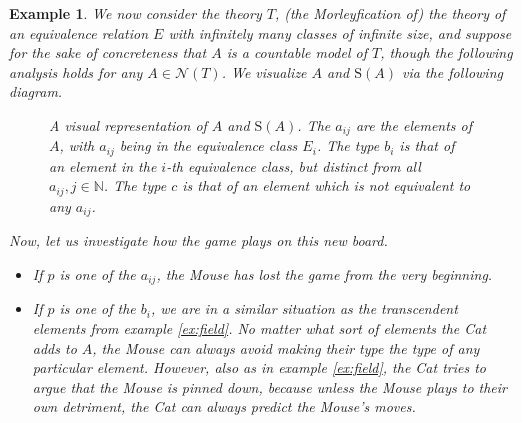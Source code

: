 \documentclass{article}
\newtheorem{example}[theorem]{Example}
\theoremstyle{nonumberplain}
\newcommand{\N}{\mathbb{N}}
\newcommand{\calN}{\mathcal{N}}
\newcommand{\Stone}{\mathrm{S}}
\begin{document}
\begin{example}\label{ex:equiv}
We now consider the theory $T$, (the Morleyfication of) the theory of an equivalence relation $E$ with infinitely many classes of infinite size, and suppose for the sake of concreteness that $A$ is a countable model of $T$, though the following analysis holds for any $A \in \calN(T)$. We visualize $A$ and $\Stone(A)$ via the following diagram.
\begin{figure}[H]
\centering
{}
\caption{A visual representation of $A$ and $\Stone(A)$. The $a_{ij}$ are the elements of $A$, with $a_{ij}$ being in the equivalence class $E_i$. The type $b_i$ is that of an element in the $i$-th equivalence class, but distinct from all $a_{ij}, j \in \N$. The type $c$ is that of an element which is not equivalent to any $a_{ij}$.}
\end{figure}

Now, let us investigate how the game plays on this new board.
\begin{itemize}
\item If $p$ is one of the $a_{ij}$, the Mouse has lost the game from the very beginning.

\item If $p$ is one of the $b_i$, we are in a similar situation as the transcendent elements from example \ref{ex:field}. No matter what sort of elements the Cat adds to $A$, the Mouse can always avoid making their type the type of any particular element. However, also as in example \ref{ex:field}, the Cat tries to argue that the Mouse is pinned down, because unless the Mouse plays to their own detriment, the Cat can always predict the Mouse's moves.


\end{itemize}
\end{example}
\end{document}
